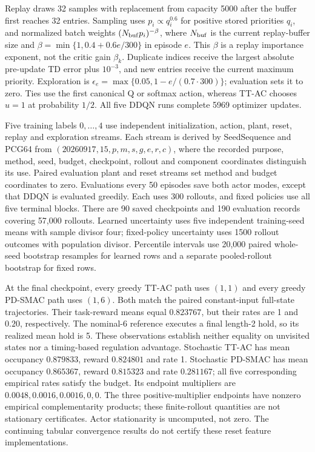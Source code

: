 \documentclass[11pt]{article}
\newcommand{\1}{\mathbf{1}}
\begin{document}
Replay draws 32 samples with replacement from capacity 5000 after the buffer first reaches 32 entries. Sampling uses $p_i\propto q_i^{0.6}$ for positive stored priorities $q_i$, and normalized batch weights $(N_{\rm buf}p_i)^{-\beta}$, where $N_{\rm buf}$ is the current replay-buffer size and $\beta=\min\{1,0.4+0.6e/300\}$ in episode $e$. This $\beta$ is a replay importance exponent, not the critic gain $\beta_k$. Duplicate indices receive the largest absolute pre-update TD error plus $10^{-3}$, and new entries receive the current maximum priority. Exploration is $\epsilon_e=\max\{0.05,1-e/(0.7\cdot300)\}$; evaluation sets it to zero. Ties use the first canonical Q or softmax action, whereas TT-AC chooses $u=1$ at probability $1/2$. All five DDQN runs complete 5969 optimizer updates. 

Five training labels $0,\ldots,4$ use independent initialization, action, plant, reset, replay and exploration streams. Each stream is derived by SeedSequence and PCG64 from $(20260917,15,p,m,s,g,e,r,c)$, where the recorded purpose, method, seed, budget, checkpoint, rollout and component coordinates distinguish its use. Paired evaluation plant and reset streams set method and budget coordinates to zero. Evaluations every 50 episodes save both actor modes, except that DDQN is evaluated greedily. Each uses 300 rollouts, and fixed policies use all five terminal blocks. There are 90 saved checkpoints and 190 evaluation records covering 57,000 rollouts. Learned uncertainty uses five independent training-seed means with sample divisor four; fixed-policy uncertainty uses 1500 rollout outcomes with population divisor. Percentile intervals use 20,000 paired whole-seed bootstrap resamples for learned rows and a separate pooled-rollout bootstrap for fixed rows.

At the final checkpoint, every greedy TT-AC path uses $(1,1)$ and every greedy PD-SMAC path uses $(1,6)$. Both match the paired constant-input full-state trajectories. Their task-reward means equal $0.823767$, but their rates are 1 and $0.20$, respectively. The nominal-6 reference executes a final length-2 hold, so its realized mean hold is 5. These observations establish neither equality on unvisited states nor a timing-based regulation advantage. Stochastic TT-AC has mean occupancy $0.879833$, reward $0.824801$ and rate 1. Stochastic PD-SMAC has mean occupancy $0.865367$, reward $0.815323$ and rate $0.281167$; all five corresponding empirical rates satisfy the budget. Its endpoint multipliers are $0.0048,0.0016,0.0016,0,0$. The three positive-multiplier endpoints have nonzero empirical complementarity products; these finite-rollout quantities are not stationary certificates. Actor stationarity is uncomputed, not zero. The continuing tabular convergence results do not certify these reset feature implementations.
\end{document}
